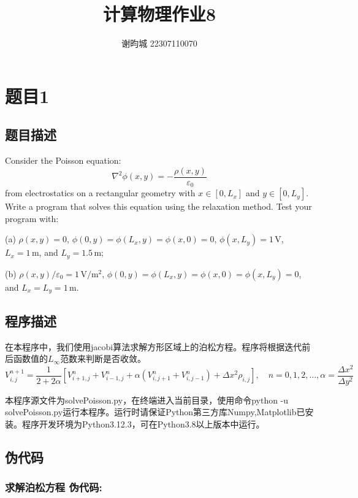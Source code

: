\documentclass[11pt]{article}
\author{谢昀城 22307110070}
\title{计算物理作业8}
\begin{document}
\maketitle




  \section{题目1}
  \subsection{题目描述}
  
  Consider the Poisson equation: 
   \[
   \nabla^2 \phi(x, y) = -\frac{\rho(x, y)}{\varepsilon_0}
   \]
   from electrostatics on a rectangular geometry with \(x \in [0, L_x]\) and \(y \in [0, L_y]\). Write a program that solves this equation using the relaxation method. Test your program with:

   (a) \(\rho(x, y) = 0\), \(\phi(0, y) = \phi(L_x, y) = \phi(x, 0) = 0\), \(\phi(x, L_y) = 1 \, \mathrm{V}\), \(L_x = 1 \, \mathrm{m}\), and \(L_y = 1.5 \, \mathrm{m}\);

   (b) \(\rho(x, y)/\varepsilon_0 = 1 \, \mathrm{V/m^2}\), \(\phi(0, y) = \phi(L_x, y) = \phi(x, 0) = \phi(x, L_y) = 0\), and \(L_x = L_y = 1 \, \mathrm{m}\).



\subsection{程序描述}
   在本程序中，我们使用jacobi算法求解方形区域上的泊松方程。程序将根据迭代前后函数值的$L_{\infty}$范数来判断是否收敛。
   \[V_{i,j}^{n+1} = \frac{1}{2+2\alpha} \left[ V_{i+1,j}^n + V_{i-1,j}^n + \alpha(V_{i,j+1}^n + V_{i,j-1}^n) + \Delta x^2 \rho_{i,j} \right], \quad n = 0, 1, 2, \ldots,\alpha = \frac{\Delta x^2}{\Delta y^2}\]

本程序源文件为solvePoisson.py，在终端进入当前目录，使用命令python -u solvePoisson.py运行本程序。运行时请保证Python第三方库Numpy,Matplotlib已安装。程序开发环境为Python3.12.3，可在Python3.8以上版本中运行。

\subsection{伪代码}
\subsubsection*{求解泊松方程 伪代码:}
\end{document}
